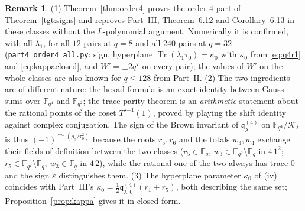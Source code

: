 \documentclass[12pt,a4paper]{amsart}
\theoremstyle{definition}
\newtheorem{remark}[theorem]{Remark}
\newcommand{\F}{\mathbb{F}}
\newcommand{\Tr}{\operatorname{Tr}}
\newcommand{\eps}{\varepsilon}
\newcommand{\Kk}{\mathcal{K}}
\newcommand{\qq}{\mathfrak{q}}
\begin{document}
\begin{remark}
(1) Theorem~\ref{thm:order4} proves the order-$4$ part of Theorem~\ref{tgt:signs} and reproves Part~III, Theorem~6.12 and Corollary~6.13 in these classes without the $L$-polynomial argument. Numerically it is confirmed, with all $\lambda_1$, for all $12$ pairs at $q=8$ and all $240$ pairs at $q=32$ (\texttt{part4\_order4\_all.py}: sign, hyperplane $\Tr(\lambda_1\tau_0)=\kappa_0$ with $\kappa_0$ from \eqref{eq:q4r1} and \eqref{eq:kappaclosed}, and $W'=\pm2q^7$ on every pair); the values of $W'$ on the whole classes are also known for $q\le128$ from Part~II. (2) The two ingredients are of different nature: the hexad formula is an exact identity between Gauss sums over $\F_{q^4}$ and $\F_{q^2}$; the trace parity theorem is an \emph{arithmetic} statement about the rational points of the coset $T'^{-1}(1)$, proved by playing the shift identity against complex conjugation. The sign of the Brown invariant of $\qq^{(4)}_\lambda$ on $\F_{q^4}/\Kk_\lambda$ is thus $(-1)^{\Tr(\rho_0/\tau_0^2)}$ because the roots $r_5,r_6$ and the totals $w_3,w_4$ exchange their fields of definition between the two classes ($r_5\in\F_q$, $w_3\in\F_{q^2}\setminus\F_q$ in $4\,1^2$; $r_5\in\F_{q^2}\setminus\F_q$, $w_3\in\F_q$ in $4\,2$), while the rational one of the two always has trace $0$ and the sign $\eps$ distinguishes them. (3) The hyperplane parameter $\kappa_0$ of (iv) coincides with Part~III's $\kappa_0=\frac12\qq^{(4)}_{\lambda,0}(r_1+r_5)$, both describing the same set; Proposition~\ref{prop:kappa} gives it in closed form.
\end{remark}
\end{document}
